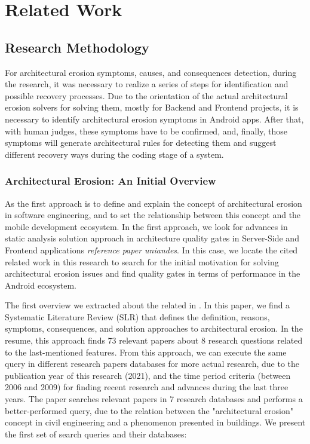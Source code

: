 \chapter{Related Work}
\label{cha:relatedwork}

\section{Research Methodology}
For architectural erosion symptoms, causes, and consequences detection, during the research, it was necessary to realize a series of steps for identification and possible recovery processes. Due to the orientation of the actual architectural erosion solvers for solving them, mostly for Backend and Frontend projects, it is necessary to identify architectural erosion symptoms in Android apps. After that, with human judges, these symptoms have to be confirmed, and, finally, those symptoms will generate architectural rules for detecting them and suggest different recovery ways during the coding stage of a system.

\subsection{Architectural Erosion: An Initial Overview}
As the first approach is to define and explain the concept of architectural erosion in software engineering, and to set the relationship between this concept and the mobile development ecosystem. In the first approach, we look for advances in static analysis solution approach in architecture quality gates in Server-Side and Frontend applications \emph{reference paper uniandes}. In this case, we locate the cited related work in this research to search for the initial motivation for solving architectural erosion issues and find quality gates in terms of performance in the Android ecosystem.

The first overview we extracted about the related in \citet{slr-base}. In this paper, we find a Systematic Literature Review (SLR) that defines the definition, reasons, symptoms, consequences, and solution approaches to architectural erosion. In the resume, this approach finds 73 relevant papers about 8 research questions related to the last-mentioned features. From this approach, we can execute the same query in different research papers databases for more actual research, due to the publication year of this research (2021), and the time period criteria (between 2006 and 2009) for finding recent research and advances during the last three years. The paper searches relevant papers in 7 research databases and performs a better-performed query, due to the relation between the "architectural erosion" concept in civil engineering and a phenomenon presented in buildings. We present the first set of search queries and their databases:

